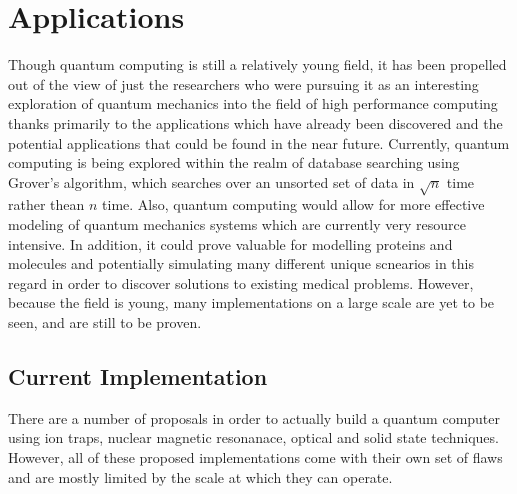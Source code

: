 \documentclass[12pt]{article}
\begin{document}
\section{Applications}
Though quantum computing is still a relatively young field, it has been propelled out of the view of just the researchers who were pursuing it as an interesting exploration of quantum mechanics into the field of high performance computing thanks primarily to the applications which have already been discovered and the potential applications that could be found in the near future. Currently, quantum computing is being explored within the realm of database searching using Grover's algorithm, which searches over an unsorted set of data in $\sqrt{n}$ time rather thean $n$ time. Also, quantum computing would allow for more effective modeling of quantum mechanics systems which are currently very resource intensive. In addition, it could prove valuable for modelling proteins and molecules and potentially simulating many different unique scnearios in this regard in order to discover solutions to existing medical problems. However, because the field is young, many implementations on a large scale are yet to be seen, and are still to be proven.
\subsection{Current Implementation}
There are a number of proposals in order to actually build a quantum computer using ion traps, nuclear magnetic resonanace, optical and solid state techniques. \cite{non} However, all of these proposed implementations come with their own set of flaws and are mostly limited by the scale at which they can operate.
\end{document}
